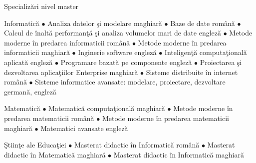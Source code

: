 \documentclass[aspectratio=169]{beamer}
\begin{document}
\begin{frame}{Specializ\u{a}ri nivel master}
\begin{minipage}[t]{0.5\linewidth}
\begin{block}{\centering Informatic\u{a}}
        {\tiny $\bullet$ Analiza datelor \c{s}i modelare maghiar\u{a}
            \newline $\bullet$ Baze de date rom\^{a}n\u{a}
            \newline $\bullet$ Calcul de \^{i}nalt\u{a} performan\c{t}\u{a} \c{s}i analiza volumelor mari de date englez\u{a}
            \newline $\bullet$ Metode moderne \^{i}n predarea informaticii rom\^{a}n\u{a}
            \newline $\bullet$ Metode moderne \^{i}n predarea informaticii maghiar\u{a}
            \newline $\bullet$ Inginerie software englez\u{a}
            \newline $\bullet$ Inteligen\c{t}\u{a} computa\c{t}ional\u{a} aplicat\u{a} englez\u{a}
            \newline $\bullet$ Programare bazat\u{a} pe componente englez\u{a}
            \newline $\bullet$ Proiectarea \c{s}i dezvoltarea aplica\c{t}iilor Enterprise maghiar\u{a}
            \newline $\bullet$ Sisteme distribuite \^{i}n internet rom\^{a}n\u{a}
            \newline $\bullet$ Sisteme informatice avansate: modelare, proiectare, dezvoltare german\u{a}, englez\u{a}
}
\end{block}        
 \end{minipage}
  \hspace{0.04\textwidth}%
 \begin{minipage}[t]{0.4\linewidth}
\begin{block}{\centering Matematic\u{a}}        
        {\tiny
            $\bullet$ Matematic\u{a} computa\c{t}ional\u{a} maghiar\u{a}
            \newline $\bullet$ Metode moderne \^{i}n predarea matematicii rom\^{a}n\u{a}
            \newline $\bullet$ Metode moderne \^{i}n predarea matematicii maghiar\u{a}
            \newline $\bullet$ Matematici avansate englez\u{a}
 }
 \end{block}        
\begin{block}{\centering \c{S}tiin\c{t}e ale Educa\c{t}iei}        
        {\tiny
            $\bullet$ Masterat didactic \^{i}n Informatic\u{a} rom\^{a}n\u{a}
            \newline $\bullet$ Masterat didactic \^{i}n Matematic\u{a} maghiar\u{a}
            \newline $\bullet$ Masterat didactic \^{i}n Informatic\u{a} maghiar\u{a}
            }
 
 \end{block}        
\end{minipage}
\end{frame}
\end{document}
